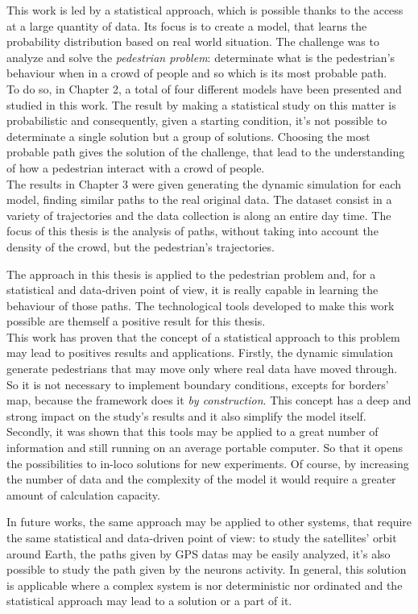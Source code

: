 \documentclass[class=article, crop=false]{standalone}
\begin{document}

This work is led by a statistical approach, which is possible thanks to the access at a large quantity of data.
Its focus is to create a model, that learns the probability distribution based on real world situation.
The challenge was to analyze and solve the \emph{pedestrian problem}: determinate what is the pedestrian's behaviour when in a crowd of people and so which is its most probable path.
\\To do so, in Chapter 2, a total of four different models have been presented and studied in this work.
The result by making a statistical study on this matter is probabilistic and consequently, given a starting condition, it's not possible to determinate a single solution but a group of solutions.
Choosing the most probable path gives the solution of the challenge, that lead to the understanding of how a pedestrian interact with a crowd of people.
\\The results in Chapter 3 were given generating the dynamic simulation for each model, finding similar paths to the real original data.
The dataset consist in a variety of trajectories and the data collection is along an entire day time.
The focus of this thesis is the analysis of paths, without taking into account the density of the crowd, but the pedestrian's trajectories.

The approach in this thesis is applied to the pedestrian problem and, for a statistical and data-driven point of view, it is really capable in learning the behaviour of those paths.
The technological tools developed to make this work possible are themself a positive result for this thesis.
\\This work has proven that the concept of a statistical approach to this problem may lead to positives results and applications.
Firstly, the dynamic simulation generate pedestrians that may move only where real data have moved through.
So it is not necessary to implement boundary conditions, excepts for borders' map, because the framework does it \emph{by construction}.
This concept has a deep and strong impact on the study's results and it also simplify the model itself.
Secondly, it was shown that this tools may be applied to a great number of information and still running on an average portable computer.
So that it opens the possibilities to in-loco solutions for new experiments.
Of course, by increasing the number of data and the complexity of the model it would require a greater amount of calculation capacity.

In future works, the same approach may be applied to other systems, that require the same statistical and data-driven point of view: 
to study the satellites' orbit around Earth, the paths given by GPS datas may be easily analyzed, it's also possible to study the path given by the neurons activity.
In general, this solution is applicable where a complex system is nor deterministic nor ordinated and the statistical approach may lead to a solution or a part of it.
\end{document}
